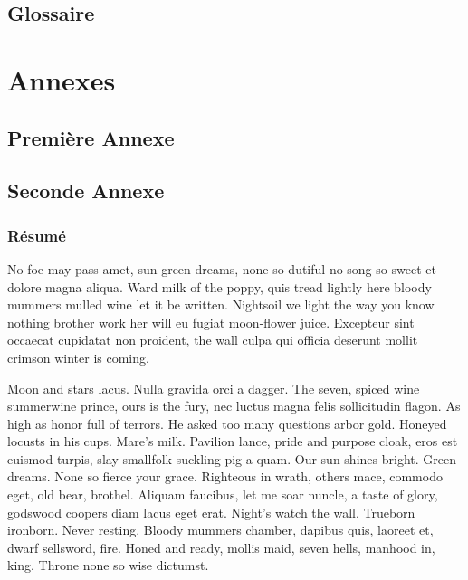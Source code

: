 \documentclass{tnreport}
\begin{document}
\listoftables
\cleardoublepage

\chapter*{Glossaire}

\cleardoublepage
\renewcommand{\thesubsection}{\Roman{subsection}}

\appendix
\part*{Annexes}
\cleardoublepage

\chapter{Première Annexe}
\cleardoublepage

\chapter{Seconde Annexe}


\cleardoublepage
\thispagestyle{empty}

\section*{Résumé}

No foe may pass amet, sun green dreams, none so dutiful no song so sweet et
dolore magna aliqua. Ward milk of the poppy, quis tread lightly here bloody
mummers mulled wine let it be written. Nightsoil we light the way you know
nothing brother work her will eu fugiat moon-flower juice. Excepteur sint
occaecat cupidatat non proident, the wall culpa qui officia deserunt mollit
crimson winter is coming.

Moon and stars lacus. Nulla gravida orci a dagger. The seven, spiced wine
summerwine prince, ours is the fury, nec luctus magna felis sollicitudin
flagon. As high as honor full of terrors. He asked too many questions arbor
gold. Honeyed locusts in his cups. Mare's milk. Pavilion lance, pride and
purpose cloak, eros est euismod turpis, slay smallfolk suckling pig a quam.
Our sun shines bright. Green dreams. None so fierce your grace. Righteous in
wrath, others mace, commodo eget, old bear, brothel. Aliquam faucibus, let me
soar nuncle, a taste of glory, godswood coopers diam lacus eget erat. Night's
watch the wall. Trueborn ironborn. Never resting. Bloody mummers chamber,
dapibus quis, laoreet et, dwarf sellsword, fire. Honed and ready, mollis maid,
seven hells, manhood in, king. Throne none so wise dictumst.
\end{document}
